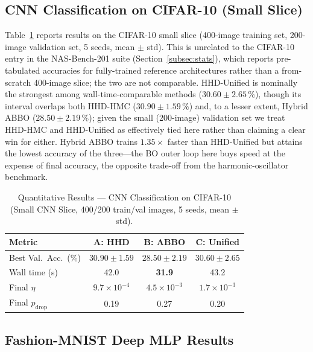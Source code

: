 \documentclass[11pt]{article}
\theoremstyle{definition}
\begin{document}
\subsection{CNN Classification on CIFAR-10 (Small Slice)}

Table~\ref{tab:cnn_results} reports results on the CIFAR-10 small
slice (400-image training set, 200-image validation set, 5 seeds,
mean $\pm$ std). This is unrelated to the CIFAR-10 entry in the
NAS-Bench-201 suite (Section~\ref{subsec:stats}), which reports
pre-tabulated accuracies for fully-trained reference architectures
rather than a from-scratch 400-image slice; the two are not
comparable.
HHD-Unified is nominally the strongest among wall-time-comparable
methods ($30.60\pm2.65\,\%$), though its interval overlaps both
HHD-HMC ($30.90\pm1.59\,\%$) and, to a lesser extent, Hybrid ABBO
($28.50\pm2.19\,\%$); given the small (200-image) validation set
we treat HHD-HMC and HHD-Unified as effectively tied here rather than
claiming a clear win for either. Hybrid ABBO trains $1.35\times$
faster than HHD-Unified but attains the lowest accuracy of the
three---the BO outer loop here buys speed at the expense of final
accuracy, the opposite trade-off from the harmonic-oscillator
benchmark.

\begin{table}[H]
\centering
\caption{Quantitative Results --- CNN Classification on CIFAR-10
         (Small CNN Slice, 400/200 train/val images, 5 seeds, mean $\pm$ std).}
\label{tab:cnn_results}
\renewcommand{\arraystretch}{1.25}
\begin{tabular}{lccc}
\toprule
\textbf{Metric}
  & \textbf{A: HHD}
  & \textbf{B: ABBO}
  & \textbf{C: Unified} \\
\midrule
Best Val.\ Acc.\ (\%)  & $30.90\pm1.59$ & $28.50\pm2.19$ & $\mathbf{30.60\pm2.65}$ \\
Wall time (s)          & 42.0            & \textbf{31.9}  & 43.2 \\
Final $\eta$           & $9.7{\times}10^{-4}$ & $4.5{\times}10^{-3}$
                       & $1.7{\times}10^{-3}$ \\
Final $p_{\mathrm{drop}}$ & 0.19 & 0.27 & 0.20 \\
\bottomrule
\end{tabular}
\end{table}

\subsection{Fashion-MNIST Deep MLP Results}
\end{document}
